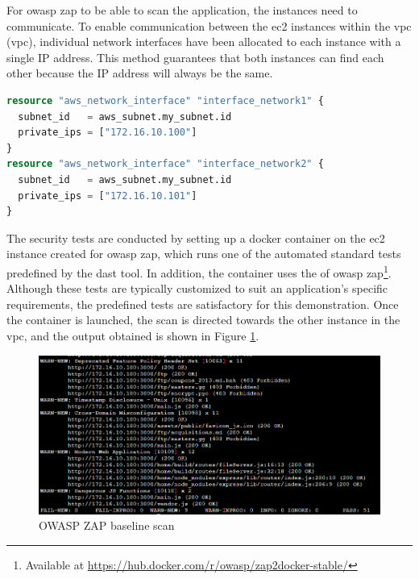 For \acrshort{owasp} \acrshort{zap} to be able to scan the application, the instances need to communicate. To enable communication between the \acrshort{ec2} instances within the \acrlong{vpc} (\acrshort{vpc}), individual network interfaces have been allocated to each instance with a single IP address. This method guarantees that both instances can find each other because the IP address will always be the same.

\vspace{2mm}
\begin{lstlisting}[language=terraform, caption=Allocation of IP adresses, captionpos=b, frame=single]
resource "aws_network_interface" "interface_network1" {
  subnet_id   = aws_subnet.my_subnet.id
  private_ips = ["172.16.10.100"]
}
resource "aws_network_interface" "interface_network2" {
  subnet_id   = aws_subnet.my_subnet.id
  private_ips = ["172.16.10.101"] 
}
\end{lstlisting}

The security tests are conducted by setting up a docker container on the \acrshort{ec2} instance created for \acrshort{owasp} \acrshort{zap}, which runs one of the automated standard tests predefined by the \acrshort{dast} tool. In addition, the container uses the  of \acrshort{owasp} \acrshort{zap}\footnote{Available at \url{https://hub.docker.com/r/owasp/zap2docker-stable/}}. Although these tests are typically customized to suit an application's specific requirements, the predefined tests are satisfactory for this demonstration. Once the container is launched, the scan is directed towards the other instance in the \acrshort{vpc}, and the output obtained is shown in Figure \ref{fig: OWASP Zap baseline scan}.

\vspace{2mm}
\begin{figure}[H]
    \centering
    \includegraphics[width=0.8\columnwidth]{Images/owasp-zap-scan.png}
    \caption{OWASP ZAP baseline scan}
    \label{fig: OWASP Zap baseline scan}
\end{figure}


